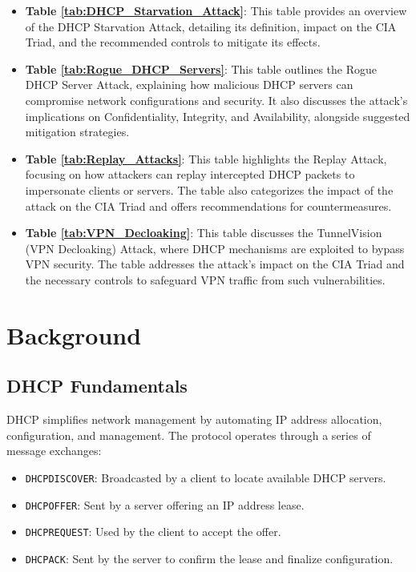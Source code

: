\documentclass[conference]{IEEEtran}
\begin{document}
        \begin{itemize}
            \item \textbf{Table \ref{tab:DHCP_Starvation_Attack}}: This table provides an overview of the DHCP Starvation Attack, detailing its definition, impact on the CIA Triad, and the recommended controls to mitigate its effects.
            \item \textbf{Table \ref{tab:Rogue_DHCP_Servers}}: This table outlines the Rogue DHCP Server Attack, explaining how malicious DHCP servers can compromise network configurations and security. It also discusses the attack’s implications on Confidentiality, Integrity, and Availability, alongside suggested mitigation strategies.
            \item \textbf{Table \ref{tab:Replay_Attacks}}: This table highlights the Replay Attack, focusing on how attackers can replay intercepted DHCP packets to impersonate clients or servers. The table also categorizes the impact of the attack on the CIA Triad and offers recommendations for countermeasures.
            \item \textbf{Table \ref{tab:VPN_Decloaking}}: This table discusses the TunnelVision (VPN Decloaking) Attack, where DHCP mechanisms are exploited to bypass VPN security. The table addresses the attack’s impact on the CIA Triad and the necessary controls to safeguard VPN traffic from such vulnerabilities.
        \end{itemize}

\section{Background}
\label{sec:Background}

    \subsection{DHCP Fundamentals}
    \label{subsec:DHCP_Fundamentals}

        DHCP simplifies network management by automating IP address allocation, configuration, and management. The protocol operates through a series of message exchanges:

        \begin{itemize}
            \item \texttt{DHCPDISCOVER}: Broadcasted by a client to locate available DHCP servers.
            \item \texttt{DHCPOFFER}: Sent by a server offering an IP address lease.
            \item \texttt{DHCPREQUEST}: Used by the client to accept the offer.
            \item \texttt{DHCPACK}: Sent by the server to confirm the lease and finalize configuration.
        \end{itemize}
\end{document}
